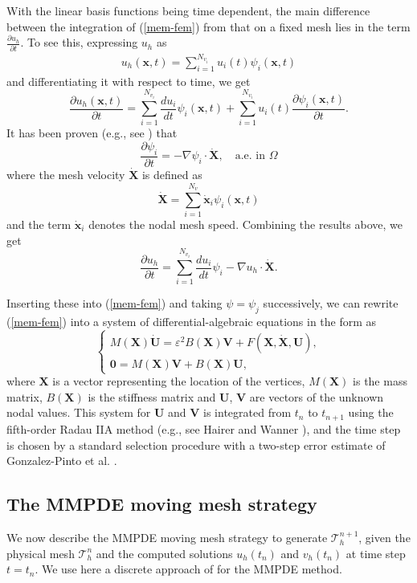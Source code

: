 \documentclass{siamart0516}
\newcommand{\eps}{\varepsilon}
\newcommand{\bx}{\mathbf{x}}
\newcommand{\bX}{\mathbf{X}}
\newcommand{\bU}{\mathbf{U}}
\newcommand{\bV}{\mathbf{V}}
\theoremstyle{plain}%
\theoremstyle{definition}
\theoremstyle{remark}
\begin{document}
With the linear basis functions being time dependent, the main difference between the integration of (\ref{mem-fem})
from that on a fixed mesh lies in the term $\frac{\partial u_h}{\partial t}$. To see this, expressing $u_h$ as
\begin{align}
u_h(\bx, t) = \sum_{i = 1}^{N_{v_i}} u_i(t) \psi_i(\bx, t)
\label{udis}
\end{align}
and differentiating it with respect to time, we get
\[
\frac{\partial u_h(\bx, t)}{\partial t} = \sum_{ i = 1}^{N_{v_i}} \frac{du_i}{dt}\psi_i(\bx, t)
+ \sum_{i = 1}^{N_{v_i}}u_i(t) \frac{\partial \psi_i(\bx,t)}{\partial t}.
\]
It has been proven (e.g., see \cite{HR11}) that
\[
\frac{\partial \psi_i}{\partial t} = -\nabla \psi_i \cdot \dot{\bX}, \quad\text{a.e. in } \Omega
\]
where the mesh velocity $\dot{\bX}$ is defined as
\[
\dot{\bX} = \sum_{i = 1}^{N_v} \dot{\bx}_i \psi_i(\bx,t)
\]
and the term $\dot{\bx}_i$ denotes the nodal mesh speed. Combining the results above, we get
\[
\frac{\partial u_h}{\partial t} = \sum_{i = 1}^{N_{v_i}} \frac{du_i}{dt} \psi_i - \nabla u_h \cdot \dot{\bX}.
\]

Inserting these into (\ref{mem-fem}) and taking $\psi = \psi_j$ successively,  we can rewrite
(\ref{mem-fem}) into a system of differential-algebraic equations in the form as
\begin{equation}
\begin{cases}
M(\bX) \dot{\bU} = \eps^2 B(\bX)\bV + F(\bX,\dot{\bX},\bU),\\[5pt]
\textbf{0} = M(\bX) \bV + B(\bX)\bU ,
\end{cases}
\label{simode}
\end{equation}
where $\bX$ is a vector representing the location of the vertices, $M(\bX)$ is the mass matrix, $B(\bX)$ is the stiffness matrix and $\bU$, $\bV$ are vectors of the unknown nodal values. This system for $\bU$ and $\bV$ is integrated from
$t_n$ to $t_{n+1}$ using the fifth-order Radau IIA method (e.g., see Hairer and Wanner \cite{HW96}),
and the time step is chosen by a standard selection procedure \cite{HW96} with a two-step error
estimate of Gonzalez-Pinto et al. \cite{Montijano2004}.

\subsection{The MMPDE moving mesh strategy}
\label{SEC:MMPDE}

We now describe the MMPDE moving mesh strategy to generate $\mathcal{T}_h^{n+1}$,
given the physical mesh $\mathcal{T}_h^n$ and the computed solutions $u_h(t_n)$
and $v_h(t_n)$ at time step $t = t_n$. We use here a discrete approach of \cite{HK2014}
for the MMPDE method.
\end{document}
